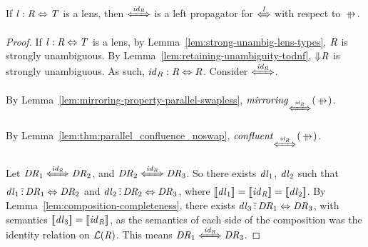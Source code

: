 \documentclass[numbers,10pt,preprint\ifanon ,nocopyrightspace\fi]{sigplanconf}
\begin{document}
\begin{lemma}
  \label{lem:id-left-prop}
  If $\mathit{l} : \mathit{R} \Leftrightarrow \mathit{T}$ is a lens,
  then $\DNFLensHasSemanticsOf{\IdentityLensOf{\Regex}}$ is a left propagator
  for $\DNFLensHasSemanticsOf{\Lens}$ with respect to $\ParallelRewrite$.
\end{lemma}
\begin{proof}
  If $\mathit{l} : \mathit{R} \Leftrightarrow \mathit{T}$ is a lens,
  by Lemma~\ref{lem:strong-unambig-lens-types},
  $\mathit{R}$ is strongly unambiguous.
  By Lemma~\ref{lem:retaining-unambiguity-todnf}, $\Downarrow\mkern-4mu \mathit{R}$ is
  strongly unambiguous.
  As such, $\mathit{id}_{\mathit{R}} : \mathit{R} \Leftrightarrow \mathit{R}$.
  Consider $\DNFLensHasSemanticsOf{\IdentityLensOf{\Regex}}$.
  
  By Lemma~\ref{lem:mirroring-property-parallel-swapless},
  $\IsMirroringWithPropertyOf{\ParallelRewrite}{\DNFLensHasSemanticsOf{\IdentityLensOf{\Regex}}}$.
  
  By Lemma~\ref{lem:thm:parallel_confluence_noswap},
  $\IsConfluentWithPropertyOf{\ParallelRewrite}{\DNFLensHasSemanticsOf{\IdentityLensOf{\Regex}}}$.
  
  Let $\DNFRegex_1 \DNFLensHasSemanticsOf{\IdentityLensOf{\Regex}} \DNFRegex_2$,
  and $\DNFRegex_2 \DNFLensHasSemanticsOf{\IdentityLensOf{\Regex}} \DNFRegex_3$.
  So there exists $\mathit{dl}_1$, $\mathit{dl}_2$ such that
  $\mathit{dl}_1 \,\tilde{:}\, \mathit{DR}_1 \Leftrightarrow \mathit{DR}_2$ and
  $\mathit{dl}_2 \,\tilde{:}\, \mathit{DR}_2 \Leftrightarrow \mathit{DR}_3$,
  where $[ \! [\mathit{dl}_1] \! ] = [ \! [\mathit{id}_{\mathit{R}}] \! ] =
  [ \! [\mathit{dl}_2] \! ]$.
  By Lemma~\ref{lem:composition-completeness}, there exists
  $\mathit{dl}_3 \,\tilde{:}\, \mathit{DR}_1 \Leftrightarrow \mathit{DR}_3$, with
  semantics $[ \! [\mathit{dl}_3] \! ] = [ \! [\mathit{id}_{\mathit{R}}] \! ]$,
  as the semantics of each side of the composition was the identity relation
  on $\mathcal{L}(\mathit{R})$.  This means
  $\DNFRegex_1 \DNFLensHasSemanticsOf{\IdentityLensOf{\Regex}} \DNFRegex_3$.


\end{proof}
\end{document}
